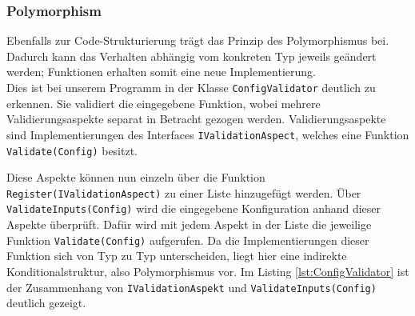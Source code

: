 \subsubsection{Polymorphism}
\label{sec:polymorphism}
Ebenfalls zur Code-Strukturierung trägt das Prinzip des Polymorphismus bei.
Dadurch kann das Verhalten abhängig vom konkreten Typ jeweils geändert werden; Funktionen erhalten somit eine neue Implementierung.\\

Dies ist bei unserem Programm in der Klasse \texttt{ConfigValidator} deutlich zu erkennen.
Sie validiert die eingegebene Funktion, wobei mehrere Validierungsaspekte separat in Betracht gezogen werden.
Validierungsaspekte sind Implementierungen des Interfaces \texttt{IValidationAspect}, welches eine Funktion \texttt{Validate(Config)} besitzt.

Diese Aspekte können nun einzeln über die Funktion \texttt{Register(IValidationAspect)} zu einer Liste hinzugefügt werden. 
Über \texttt{ValidateInputs(Config)} wird die eingegebene Konfiguration anhand dieser Aspekte überprüft.
Dafür wird mit jedem Aspekt in der Liste die jeweilige Funktion \texttt{Validate(Config)} aufgerufen.
Da die Implementierungen dieser Funktion sich von Typ zu Typ unterscheiden, liegt hier eine indirekte Konditionalstruktur, also Polymorphismus vor.
Im Listing \ref{lst:ConfigValidator} ist der Zusammenhang von \texttt{IValidationAspekt} und \texttt{ValidateInputs(Config)} deutlich gezeigt.


